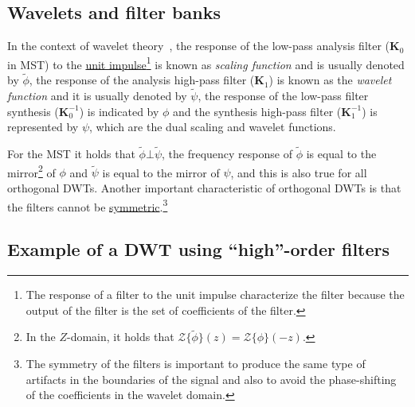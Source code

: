 
\subsection{Wavelets and filter banks}

In the context of wavelet theory~\cite{burrus2013wavelets}, the
response of the low-pass analysis filter (${\mathbf K}_0$ in MST)
to the
\href{https://en.wikipedia.org/?title=Unit_impulse&redirect=no}{unit
  impulse}\footnote{The response of a filter to the unit impulse
characterize the filter because the output of the filter is the set of
coefficients of the filter.} is known as \emph{scaling function} and is
usually denoted by $\tilde\phi$, the response of the analysis
high-pass filter (${\mathbf K}_1$) is known as the \emph{wavelet
function} and it is usually denoted by $\tilde\psi$, the response of
the low-pass filter synthesis (${\mathbf K}^{-1}_0$) is indicated by
$\phi$ and the synthesis high-pass filter (${\mathbf K}^{-1}_1$) is
represented by $\psi$, which are the dual scaling and wavelet functions.

For the MST it holds that $\tilde\phi\bot\tilde\psi$, the frequency
response of $\tilde\phi$ is equal to the mirror\footnote{In the
  $Z$-domain, it holds that
  ${\mathcal Z}\{\tilde\phi\}(z)={\mathcal Z}\{\phi\}(-z)$.} of $\phi$
and $\tilde\psi$ is equal to the mirror of $\psi$, and this is also
true for all orthogonal DWTs. Another important characteristic of
orthogonal DWTs is that the filters cannot be
\href{https://en.wikipedia.org/wiki/Symmetry}{symmetric}.\footnote{The
  symmetry of the filters is important to produce the same type of
  artifacts in the boundaries of the signal and also to avoid the
  phase-shifting of the coefficients in the wavelet domain.}



\subsection{Example of a DWT using ``high''-order filters}

